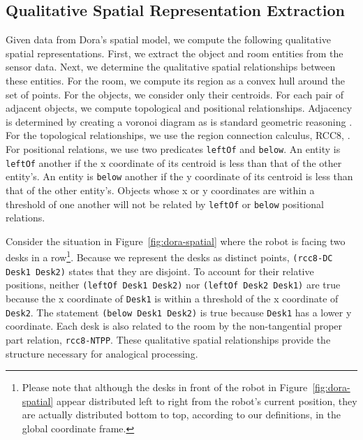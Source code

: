 \documentclass[letterpaper]{article}
\newcommand{\from}[2]{\textcolor{red}{\noindent\textbf{//}\textbf{Note
      from #1:}\textsc{ #2}\textbf{//}}}
\newcommand{\fw}[1]{\texttt{#1}}
\begin{document}
\subsection{Qualitative Spatial Representation Extraction}

Given data from Dora's spatial model, we compute the following qualitative spatial representations. First, we extract the object and room entities from the sensor data. Next, we determine the qualitative spatial relationships between these entities. For the room, we compute its region as a convex hull around the set of points. For the objects, we consider only their centroids. For each pair of adjacent objects, we compute topological and positional relationships. Adjacency is determined by creating a voronoi diagram as is standard geometric reasoning \cite{Forbus/etal2003}. For the topological relationships, we use the region connection calculus, RCC8, \cite{Cohn:2001}. For positional relations, we use two predicates \fw{leftOf} and \fw{below}. An entity is \fw{leftOf} another if the x coordinate of its centroid is less than that of the other entity's. An entity is \fw{below} another if the y coordinate of its centroid is less than that of the other entity's. Objects whose x or y coordinates are within a threshold of one another will not be related by \fw{leftOf} or \fw{below} positional relations.


Consider the situation in Figure~\ref{fig:dora-spatial} where the robot is facing two desks in a row\footnote{Please note that although the desks in front of the robot in Figure~\ref{fig:dora-spatial} appear distributed left to right from the robot's current position, they are actually distributed bottom to top, according to our definitions, in the global coordinate frame.}. Because we represent the desks as distinct points, \fw{(rcc8-DC Desk1 Desk2)} states that they are disjoint. To account for their relative positions, neither \fw{(leftOf Desk1 Desk2)} nor \fw{(leftOf Desk2 Desk1)} are true because the x coordinate of \fw{Desk1} is within a threshold of the x coordinate of \fw{Desk2}. The statement \fw{(below Desk1 Desk2)} is true because \fw{Desk1} has a lower y coordinate. Each desk is also related to the room by the non-tangential proper part relation, \fw{rcc8-NTPP}. These qualitative spatial relationships provide the structure necessary for analogical processing.
\end{document}
